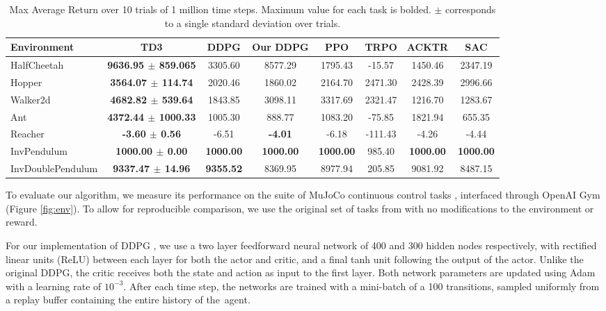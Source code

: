\documentclass{article}
\begin{document}
\begin{table}[t]
\centering
\caption{Max Average Return over 10 trials of 1 million time steps. Maximum value for each task is bolded. $\pm$ corresponds to a single standard deviation over trials. }
\label{results}
\begin{center}
\begin{small}
\begin{tabular}{lccccccc}
\toprule
\bf{Environment} & \bf{TD3} & \bf{DDPG} & \bf{Our DDPG} & \bf{PPO} & \bf{TRPO} & \bf{ACKTR} & \bf{SAC} \\
\midrule
HalfCheetah 	& \bf{9636.95 $\pm$ 859.065}& 3305.60 		& 8577.29 	& 1795.43 		& -15.57  & 1450.46 & 2347.19 \\  
Hopper 			& \bf{3564.07 $\pm$ 114.74} & 2020.46 		& 1860.02		& 2164.70		& 2471.30 & 2428.39 & 2996.66 \\
Walker2d 		& \bf{4682.82 $\pm$ 539.64} & 1843.85		& 3098.11 		& 3317.69		& 2321.47 & 1216.70 & 1283.67 \\
Ant 			& \bf{4372.44 $\pm$ 1000.33} & 1005.30 		& 888.77 		& 1083.20		& -75.85  & 1821.94 & 655.35 \\
Reacher 		& \bf{-3.60 $\pm$ 0.56}		& -6.51 	   	& \bf{-4.01} 	& -6.18			& -111.43 & -4.26 & -4.44\\
InvPendulum 	& \bf{1000.00 $\pm$ 0.00} 		& \bf{1000.00} 	& \bf{1000.00}  & \bf{1000.00}	& 985.40  & \bf{1000.00} & \bf{1000.00} \\
InvDoublePendulum 	& \bf{9337.47 $\pm$ 14.96} 	& \bf{9355.52} 	& 8369.95 		& 8977.94		& 205.85  & 9081.92 & 8487.15 \\
\bottomrule
\end{tabular}
\end{small}
\end{center}
\vskip -0.1in
\end{table}

To evaluate our algorithm, we measure its performance on the suite of MuJoCo continuous control tasks \cite{mujoco}, interfaced through OpenAI Gym \cite{OpenAIGym} (Figure \ref{fig:env}). To allow for reproducible comparison, we use the original set of tasks from \citet{OpenAIGym} with no modifications to the environment or reward. 

For our implementation of DDPG \cite{DDPG}, we use a two layer feedforward neural network of 400 and 300 hidden nodes respectively, with rectified linear units (ReLU) between each layer for both the actor and critic, and a final tanh unit following the output of the actor. Unlike the original DDPG, the critic receives both the state and action as input to the first layer. Both network parameters are updated using Adam \cite{adam} with a learning rate of $10^{-3}$. After each time step, the networks are trained with a mini-batch of a 100 transitions, sampled uniformly from a replay buffer containing the entire history of the~agent. %
\end{document}
